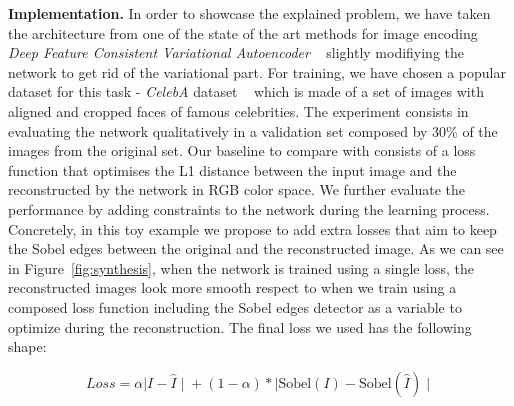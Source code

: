 \textbf{Implementation.} In order to showcase the explained problem, we have taken the architecture from one of the state of the art methods for image encoding \textit{Deep Feature Consistent Variational Autoencoder} ~\citep{DBLP:journals/corr/HouSSQ16a} slightly modifiying the network to get rid of the variational part. For training, we have chosen a popular dataset for this task - \textit{CelebA} dataset ~\citep{liu2015faceattributes} which is made of a set of images with aligned and cropped faces of famous celebrities. The experiment consists in evaluating the network qualitatively in a validation set composed by 30\% of the images from the original set. Our baseline to compare with consists of a loss function that optimises the L1 distance between the input image and the reconstructed by the network in RGB color space. We further evaluate the performance by adding constraints to the network during the learning process. Concretely, in this toy example we propose to add extra losses that aim  to keep the Sobel edges between the original and the reconstructed image. As we can see in Figure~\ref{fig:synthesis}, when the network is trained using a single loss, the reconstructed images look more smooth respect to when we train using a composed loss function including the Sobel edges detector as a variable to optimize during the reconstruction. The final loss we used has the following shape:

\begin{equation}
    \label{eq:synthesis_loss1}
	Loss = \alpha {\mid I - \hat{I} \mid} + (1 - \alpha) * {\mid \text{Sobel}(I) - \text{Sobel}(\hat{I}) \mid}
\end{equation}

